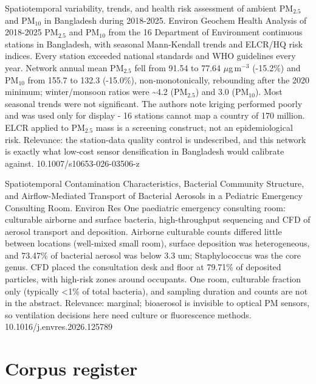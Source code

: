 \documentclass[10pt]{article}
\begin{document}
{Spatiotemporal variability, trends, and health risk assessment of ambient PM$_{2.5}$ and PM$_{10}$ in Bangladesh during 2018-2025.}
{Environ Geochem Health}
{Analysis of 2018-2025 PM$_{2.5}$ and PM$_{10}$ from the 16 Department of Environment continuous stations in Bangladesh, with seasonal Mann-Kendall trends and ELCR/HQ risk indices. Every station exceeded national standards and WHO guidelines every year. Network annual mean PM$_{2.5}$ fell from 91.54 to 77.64 $\mu$g\,m$^{-3}$ (-15.2\%) and PM$_{10}$ from 155.7 to 132.3 (-15.0\%), non-monotonically, rebounding after the 2020 minimum; winter/monsoon ratios were \textasciitilde{}4.2 (PM$_{2.5}$) and 3.0 (PM$_{10}$). Most seasonal trends were not significant. The authors note kriging performed poorly and was used only for display - 16 stations cannot map a country of 170 million. ELCR applied to PM$_{2.5}$ mass is a screening construct, not an epidemiological risk. Relevance: the station-data quality control is undescribed, and this network is exactly what low-cost sensor densification in Bangladesh would calibrate against.}
{10.1007/s10653-026-03506-z}

\par{}\baselineskip{}\baselineskip
{}

{Spatiotemporal Contamination Characteristics, Bacterial Community Structure, and Airflow-Mediated Transport of Bacterial Aerosols in a Pediatric Emergency Consulting Room.}
{Environ Res}
{One paediatric emergency consulting room: culturable airborne and surface bacteria, high-throughput sequencing and CFD of aerosol transport and deposition. Airborne culturable counts differed little between locations (well-mixed small room), surface deposition was heterogeneous, and 73.47\% of bacterial aerosol was below 3.3 um; Staphylococcus was the core genus. CFD placed the consultation desk and floor at 79.71\% of deposited particles, with high-risk zones around occupants. One room, culturable fraction only (typically <1\% of total bacteria), and sampling duration and counts are not in the abstract. Relevance: marginal; bioaerosol is invisible to optical PM sensors, so ventilation decisions here need culture or fluorescence methods.}
{10.1016/j.envres.2026.125789}

\clearpage
\section*{\sffamily\bfseries\color{Deep}Corpus register}
\vspace{-1.5mm}{\color{Amber}\rule{\linewidth}{1.1pt}}\vspace{2.5mm}
\end{document}
